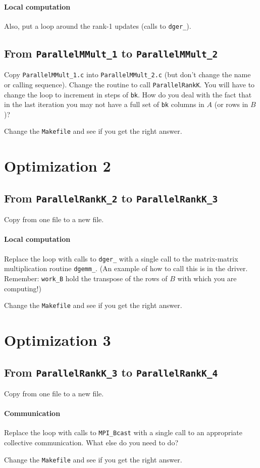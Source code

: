 \documentclass[10pt]{article}
\begin{document}
\paragraph*{Local computation}

Also, put a loop around the rank-1 updates (calls to {\tt dger\_}).

\subsection{From {\tt ParallelMMult\_1} to {\tt ParallelMMult\_2}}

Copy {\tt ParallelMMult\_1.c} into {\tt ParallelMMult\_2.c} (but don't
change the name or calling sequence).  
Change the routine to call {\tt ParallelRankK}.  You will have to
change the loop to increment in steps of {\tt bk}.  How do you deal
with the fact that in the last iteration you may not have a full set
of {\tt bk} columns in $ A $ (or rows in $ B $)?

Change the {\tt Makefile} and see if you get the right answer.


\section{Optimization 2}

\subsection{From {\tt ParallelRankK\_2} to {\tt ParallelRankK\_3}}

Copy from one file to a new file.

\paragraph*{Local computation}
 
Replace the loop with calls to {\tt dger\_} with a single call to the
matrix-matrix multiplication routine {\tt dgemm\_}.  (An example 
of how to call this is in the driver.  Remember: {\tt work\_B} hold
the transpose of the rows of $ B $ with which you are computing!)
 
Change the {\tt Makefile} and see if you get the right answer.

\section{Optimization 3}

\subsection{From {\tt ParallelRankK\_3} to {\tt ParallelRankK\_4}}

Copy from one file to a new file.

\paragraph*{Communication}
 
Replace the loop with calls to {\tt MPI\_Bcast} with a single call to 
an appropriate collective communication.  What else do you need to do?
 
Change the {\tt Makefile} and see if you get the right answer.
\end{document}
